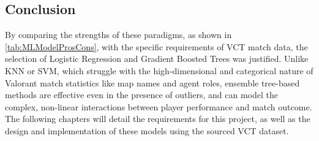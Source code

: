 \subsection*{Conclusion}
By comparing the strengths of these paradigms, as shown in \autoref{tab:MLModelProsCons}, with the specific requirements of VCT match data, the selection of Logistic Regression and Gradient Boosted Trees was justified. Unlike KNN or SVM, which struggle with the high-dimensional and categorical nature of Valorant match statistics like map names and agent roles, ensemble tree-based methods are effective even in the presence of outliers, and can model the complex, non-linear interactions between player performance and match outcome. The following chapters will detail the requirements for this project, as well as the design and implementation of these models using the sourced VCT dataset.